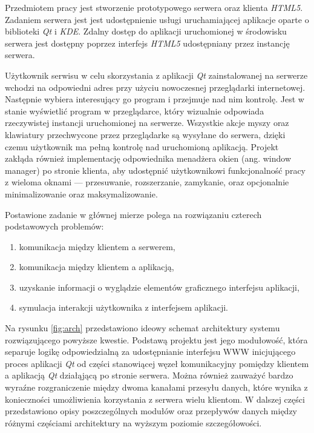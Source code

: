 Przedmiotem pracy jest stworzenie prototypowego serwera oraz klienta \emph{HTML5}. Zadaniem serwera jest jest udostępnienie usługi uruchamiającej aplikacje oparte o biblioteki \emph{Qt} i \emph{KDE}. Zdalny dostęp do aplikacji uruchomionej w środowisku serwera jest dostępny poprzez interfejs \emph{HTML5} udostępniany przez instancję serwera.

Użytkownik serwisu w celu skorzystania z aplikacji \emph{Qt} zainstalowanej na serwerze wchodzi na odpowiedni adres przy użyciu nowoczesnej przeglądarki internetowej. Następnie wybiera interesujący go program i przejmuje nad nim kontrolę. Jest w stanie wyświetlić program w przeglądarce, który wizualnie odpowiada rzeczywistej instancji uruchomionej na serwerze. Wszystkie akcje myszy oraz klawiatury przechwycone przez przeglądarke są wysyłane do serwera, dzięki czemu użytkownik ma pełną kontrolę nad uruchomioną aplikacją. Projekt zakłąda również implementację odpowiednika menadżera okien (ang. window manager) po stronie klienta, aby udostępnić użytkownikowi funkcjonalność pracy z wieloma oknami --- przesuwanie, rozszerzanie, zamykanie, oraz opcjonalnie minimalizowanie oraz maksymalizowanie.

Postawione zadanie w głównej mierze polega na rozwiązaniu czterech podstawowych problemów:
\begin{enumerate}
  \item komunikacja między klientem a serwerem,
  \item komunikacja między klientem a aplikacją,
  \item uzyskanie informacji o wyglądzie elementów graficznego interfejsu aplikacji,
  \item symulacja interakcji użytkownika z interfejsem aplikacji.
\end{enumerate}

Na rysunku \ref{fig:arch} przedstawiono ideowy schemat architektury systemu rozwiązującego powyższe kwestie. 
Podstawą projektu jest jego modułowość, która separuje logikę odpowiedzialną za udostępnianie interfejsu WWW inicjującego proces aplikacji \emph{Qt} od części stanowiącej węzeł komunikacyjny pomiędzy klientem a aplikacją \emph{Qt} działąjącą po stronie serwera.
Można również zauważyć bardzo wyraźne rozgraniczenie między dwoma kanałami przesyłu danych, które wynika z konieczności umożliwienia korzystania z serwera wielu klientom. W dalszej części przedstawiono opisy poszczególnych modułów oraz przepływów danych między różnymi częściami architektury na wyższym poziomie szczegółowości.

